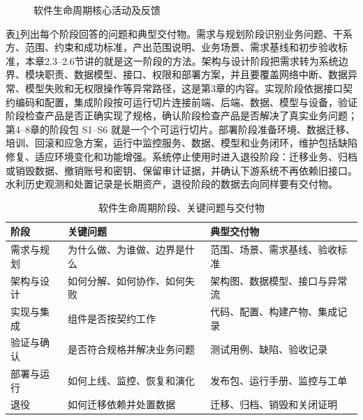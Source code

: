 \begin{figure}[htbp]
\centering
{}
\caption{软件生命周期核心活动及反馈}
\label{fig:sdlc-flow}
\end{figure}

表\ref{tab:sdlc-deliverables}列出每个阶段回答的问题和典型交付物。需求与规划阶段识别业务问题、干系方、范围、约束和成功标准，产出范围说明、业务场景、需求基线和初步验收标准，本章2.3--2.6节讲的就是这一阶段的方法。架构与设计阶段把需求转为系统边界、模块职责、数据模型、接口、权限和部署方案，并且要覆盖网络中断、数据异常、模型失败和无权限操作等异常路径，这是第3章的内容。实现阶段依据接口契约编码和配置，集成阶段按可运行切片连接前端、后端、数据、模型与设备，验证阶段检查产品是否正确实现了规格，确认阶段检查产品是否解决了真实业务问题；第4--8章的阶段包 S1--S6 就是一个个可运行切片。部署阶段准备环境、数据迁移、培训、回滚和应急方案，运行中监控服务、数据、模型和业务闭环，维护包括缺陷修复、适应环境变化和功能增强。系统停止使用时进入退役阶段：迁移业务、归档或销毁数据、撤销账号和密钥、保留审计证据，并确认下游系统不再依赖旧接口。水利历史观测和处置记录是长期资产，退役阶段的数据去向同样要有交付物。

\begin{table}[htbp]
\centering
\caption{软件生命周期阶段、关键问题与交付物}
\label{tab:sdlc-deliverables}
\begin{tabular}{p{2.5cm}p{5.0cm}p{5.1cm}}
\toprule
阶段 & 关键问题 & 典型交付物 \\
\midrule
需求与规划 & 为什么做、为谁做、边界是什么 & 范围、场景、需求基线、验收标准 \\
架构与设计 & 如何分解、如何协作、如何失败 & 架构图、数据模型、接口与异常流 \\
实现与集成 & 组件是否按契约工作 & 代码、配置、构建产物、集成记录 \\
验证与确认 & 是否符合规格并解决业务问题 & 测试用例、缺陷、验收记录 \\
部署与运行 & 如何上线、监控、恢复和演化 & 发布包、运行手册、监控与工单 \\
退役 & 如何迁移依赖并处置数据 & 迁移、归档、销毁和关闭证明 \\
\bottomrule
\end{tabular}
\end{table}

